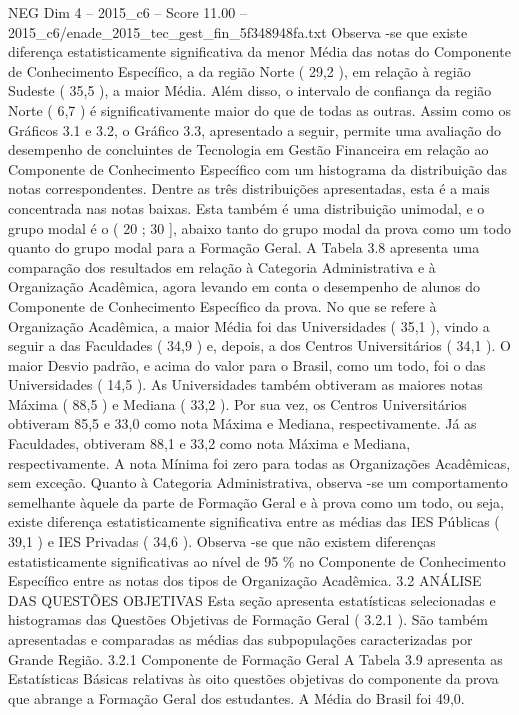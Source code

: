 \begin{textsample}{NEG Dim 4 – 2015\_c6 – Score 11.00 – 2015\_c6/enade\_2015\_tec\_gest\_fin\_5f348948fa.txt}
Observa -se que existe diferença estatisticamente significativa da menor Média das notas do Componente de Conhecimento Específico, a da região Norte ( 29,2 ), em relação à região Sudeste ( 35,5 ), a maior Média.
Além disso, o intervalo de confiança da região Norte ( 6,7 ) é significativamente maior do que de todas as outras.
Assim como os Gráficos 3.1 e 3.2, o Gráfico 3.3, apresentado a seguir, permite uma avaliação do desempenho de concluintes de Tecnologia em Gestão Financeira em relação ao Componente de Conhecimento Específico com um histograma da distribuição das notas correspondentes.
Dentre as três distribuições apresentadas, esta é a mais concentrada nas notas baixas.
Esta também é uma distribuição unimodal, e o grupo modal é o ( 20 ; 30 ], abaixo tanto do grupo modal da prova como um todo quanto do grupo modal para a Formação Geral.
A Tabela 3.8 apresenta uma comparação dos resultados em relação à Categoria Administrativa e à Organização Acadêmica, agora levando em conta o desempenho de alunos do Componente de Conhecimento Específico da prova.
No que se refere à Organização Acadêmica, a maior Média foi das Universidades ( 35,1 ), vindo a seguir a das Faculdades ( 34,9 ) e, depois, a dos Centros Universitários ( 34,1 ).
O maior Desvio padrão, e acima do valor para o Brasil, como um todo, foi o das Universidades ( 14,5 ).
As Universidades também obtiveram as maiores notas Máxima ( 88,5 ) e Mediana ( 33,2 ).
Por sua vez, os Centros Universitários obtiveram 85,5 e 33,0 como nota Máxima e Mediana, respectivamente.
Já as Faculdades, obtiveram 88,1 e 33,2 como nota Máxima e Mediana, respectivamente.
A nota Mínima foi zero para todas as Organizações Acadêmicas, sem exceção.
Quanto à Categoria Administrativa, observa -se um comportamento semelhante àquele da parte de Formação Geral e à prova como um todo, ou seja, existe diferença estatisticamente significativa entre as médias das IES Públicas ( 39,1 ) e IES Privadas ( 34,6 ).
Observa -se que não existem diferenças estatisticamente significativas ao nível de 95 \% no Componente de Conhecimento Específico entre as notas dos tipos de Organização Acadêmica. 3.2 ANÁLISE DAS QUESTÕES OBJETIVAS Esta seção apresenta estatísticas selecionadas e histogramas das Questões Objetivas de Formação Geral ( 3.2.1 ).
São também apresentadas e comparadas as médias das subpopulações caracterizadas por Grande Região. 3.2.1 Componente de Formação Geral A Tabela 3.9 apresenta as Estatísticas Básicas relativas às oito questões objetivas do componente da prova que abrange a Formação Geral dos estudantes.
A Média do Brasil foi 49,0.

\end{textsample}
